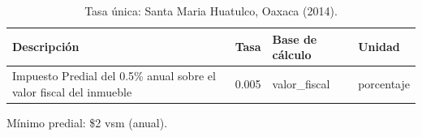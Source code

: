 \begin{table}[htbp]
\centering
\small
\begin{tabular}{lrll}
\toprule
Descripción & Tasa & Base de cálculo & Unidad \\
\midrule
Impuesto Predial del 0.5\% anual sobre el valor fiscal del inmueble & 0.005 & valor\_fiscal & porcentaje \\
\bottomrule
\end{tabular}
\caption{Tasa única: Santa Maria Huatulco, Oaxaca (2014).}
\label{tab:esquema-tasa_unica}

\par\smallskip\footnotesize Mínimo predial: \$2 vsm (anual).
\end{table}
